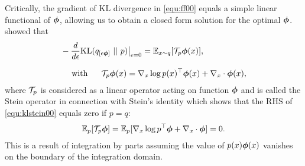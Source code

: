 \documentclass{article} %
\begin{document}
Critically, the gradient of KL divergence in \eqref{equ:ff00} 
equals a simple linear functional of ${\boldsymbol{\phi}}$, allowing us to obtain a closed form solution for the optimal ${\boldsymbol{\phi}}$. 
\citet{liu2016stein} showed that 
\begin{align}\label{equ:klstein00}
&- \frac{d}{d\epsilon} \mathrm{KL}(q_{[\epsilon{\boldsymbol{\phi}}]} ~|| ~ p) \big |_{\epsilon = 0}  = \mathbb{E}_{x\sim q}[{\mathcal{T}}_p {\boldsymbol{\phi}}(x)], \\[.5\baselineskip]
&~~~~\text{with}~~~~~ {\mathcal{T}}_p {\boldsymbol{\phi}}(x)  = \nabla_x \log p(x) ^\top {\boldsymbol{\phi}} (x)+ \nabla_x \cdot {\boldsymbol{\phi}}(x),  
\end{align}
where ${\mathcal{T}}_p$ is considered as a linear operator acting on function ${\boldsymbol{\phi}}$ and is called the Stein operator in connection with Stein's identity which shows that 
the RHS of \eqref{equ:klstein00} equals zero if $p = q$: 
\begin{align}\label{equ:steinid}
\mathbb{E}_{p}[{\mathcal{T}}_p {\boldsymbol{\phi}}] =\mathbb{E}_{p}[ \nabla_x \log p ^\top {\boldsymbol{\phi}} + \nabla_x \cdot {\boldsymbol{\phi}}] = 0. 
\end{align}
This is a result of integration by parts assuming the value of $p(x){\boldsymbol{\phi}}(x)$ vanishes on the boundary of the integration domain.   
%
%
%
\end{document}

